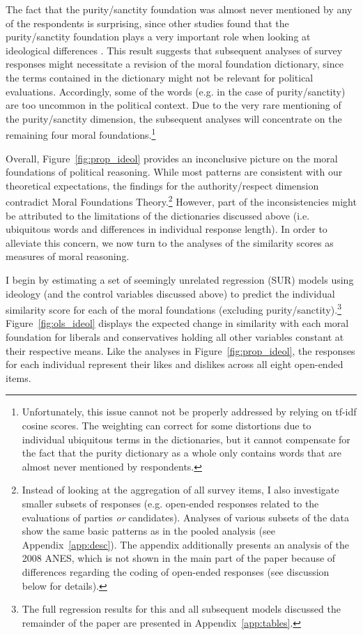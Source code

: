 \documentclass[12pt]{article}
\begin{document}
The fact that the purity/sanctity foundation was almost never mentioned by any of the respondents is surprising, since other studies found that the purity/sanctity foundation plays a very important role when looking at ideological differences \citep{koleva2012tracing}. This result suggests that subsequent analyses of survey responses might necessitate a revision of the moral foundation dictionary, since the terms contained in the dictionary might not be relevant for political evaluations. Accordingly, some of the words (e.g. in the case of purity/sanctity) are too uncommon in the political context. Due to the very rare mentioning of the purity/sanctity dimension, the subsequent analyses will concentrate on the remaining four moral foundations.\footnote{Unfortunately, this issue cannot not be properly addressed by relying on tf-idf cosine scores. The weighting can correct for some distortions due to individual ubiquitous terms in the dictionaries, but it cannot compensate for the fact that the purity dictionary as a whole only contains words that are almost never mentioned by respondents.}

Overall, Figure~\ref{fig:prop_ideol} provides an inconclusive picture on the moral foundations of political reasoning. While most patterns are consistent with our theoretical expectations, the findings for the authority/respect dimension contradict Moral Foundations Theory.\footnote{Instead of looking at the aggregation of all survey items, I also investigate smaller subsets of responses (e.g. open-ended responses related to the evaluations of parties \textit{or} candidates). Analyses of various subsets of the data show the same basic patterns as in the pooled analysis (see Appendix~\ref{app:desc}). The appendix additionally presents an analysis of the 2008 ANES, which is not shown in the main part of the paper because of differences regarding the coding of open-ended responses (see discussion below for details).} However, part of the inconsistencies might be attributed to the limitations of the dictionaries discussed above (i.e. ubiquitous words and differences in individual response length). In order to alleviate this concern, we now turn to the analyses of the similarity scores as measures of moral reasoning.

I begin by estimating a set of seemingly unrelated regression (SUR) models using ideology (and the control variables discussed above) to predict the individual similarity score for each of the moral foundations (excluding purity/sanctity).\footnote{The full regression results for this and all subsequent models discussed the remainder of the paper are presented in Appendix~\ref{app:tables}.} Figure~\ref{fig:ols_ideol} displays the expected change in similarity with each moral foundation for liberals and conservatives holding all other variables constant at their respective means. Like the analyses in Figure~\ref{fig:prop_ideol}, the responses for each individual represent their likes and dislikes across all eight open-ended items.
\end{document}
